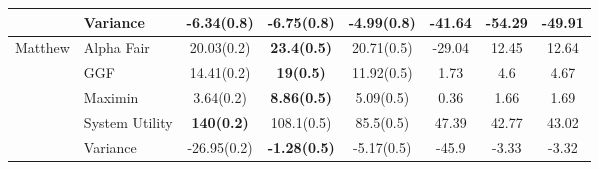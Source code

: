 \begin{table*}[t]
{\begin{tabular}{clcccccc}
                                         & Variance        & -6.34(0.8)           & -6.75(0.8)            & \textbf{-4.99(0.8)}  & -41.64         & -54.29                       & -49.91             \\
\hline
\multirow{5}{*}{Matthew}                 & Alpha Fair      & 20.03(0.2)           & \textbf{23.4(0.5)}    & 20.71(0.5)           & -29.04         & 12.45                        & 12.64              \\
                                         & GGF             & 14.41(0.2)           & \textbf{19(0.5)}      & 11.92(0.5)           & 1.73           & 4.6                          & 4.67               \\
                                         & Maximin         & 3.64(0.2)            & \textbf{8.86(0.5)}    & 5.09(0.5)            & 0.36           & 1.66                         & 1.69               \\
                                         & System Utility  & \textbf{140(0.2)}    & 108.1(0.5)            & 85.5(0.5)            & 47.39          & 42.77                        & 43.02              \\
                                         & Variance        & -26.95(0.2)          & \textbf{-1.28(0.5)}   & -5.17(0.5)           & -45.9          & -3.33                        & -3.32      \\       
\hline
\end{tabular}
}
\end{table*}